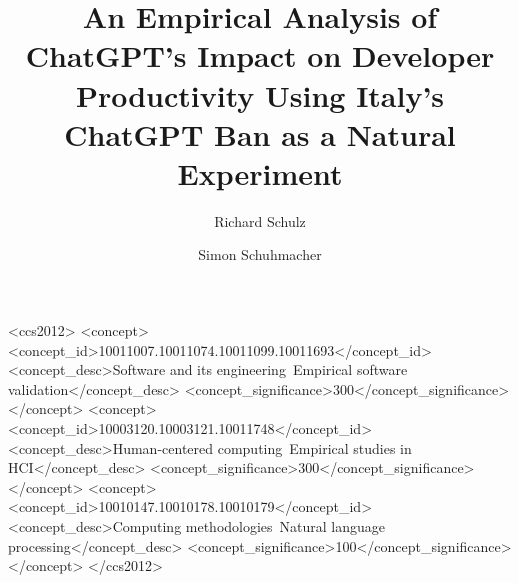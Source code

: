 \title{An Empirical Analysis of ChatGPT's Impact on Developer Productivity Using Italy's ChatGPT Ban as a Natural Experiment}

\author{Richard Schulz}

\author{Simon Schuhmacher}
\authornotemark[1]




\begin{CCSXML}
<ccs2012>
   <concept>
       <concept_id>10011007.10011074.10011099.10011693</concept_id>
       <concept_desc>Software and its engineering~Empirical software validation</concept_desc>
       <concept_significance>300</concept_significance>
       </concept>
   <concept>
       <concept_id>10003120.10003121.10011748</concept_id>
       <concept_desc>Human-centered computing~Empirical studies in HCI</concept_desc>
       <concept_significance>300</concept_significance>
       </concept>
   <concept>
       <concept_id>10010147.10010178.10010179</concept_id>
       <concept_desc>Computing methodologies~Natural language processing</concept_desc>
       <concept_significance>100</concept_significance>
       </concept>
 </ccs2012>
\end{CCSXML}

